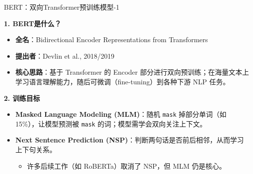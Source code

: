 \documentclass{beamer}
\begin{document}
\begin{frame}{BERT：双向Transformer预训练模型-1}

  \textbf{1. BERT是什么？}
  \begin{itemize}
    \item \textbf{全名}：Bidirectional Encoder Representations from Transformers
    \item \textbf{提出者}：Devlin et al., 2018/2019
    \item \textbf{核心思路}：基于 Transformer 的 Encoder 部分进行双向预训练；在海量文本上学习语言理解能力，随后可微调（fine-tuning）到各种下游 NLP 任务。
  \end{itemize}
  \vspace{1em}

  \textbf{2. 训练目标}
  \begin{itemize}
    \item \textbf{Masked Language Modeling (MLM)}：随机 \texttt{mask} 掉部分单词（如 15\%），让模型预测被 \texttt{mask} 的词；模型需学会双向关注上下文。
    \item \textbf{Next Sentence Prediction (NSP)}：判断两句话是否前后相邻，从而学习上下句关系。  
      \begin{itemize}
        \item 许多后续工作（如 RoBERTa）取消了 NSP，但 MLM 仍是核心。
      \end{itemize}
  \end{itemize}
\end{frame}
\end{document}
